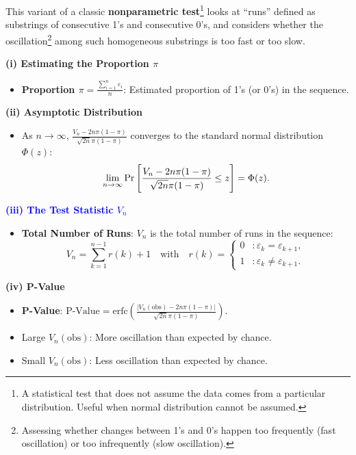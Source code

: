 \documentclass[12pt,openany]{book}
\theoremstyle{definition}
\begin{document}
	This variant of a classic \textbf{nonparametric test}\footnote{A statistical test that does not assume the data comes from a particular distribution. Useful when normal distribution cannot be assumed.} looks at ``runs'' defined as substrings of consecutive 1's and consecutive 0's, and considers whether the oscillation\footnote{Assessing whether changes between 1's and 0's happen too frequently (fast oscillation) or too infrequently (slow oscillation).} among such homogeneous substrings is too fast or too slow.
	\vspace{12pt}
	\begin{tcolorbox}[colback=white,colframe=lemcolor,arc=5pt,title={\color{white}\bf Runs Test}]
		\textbf{(i) Estimating the Proportion \( \pi \)}
		\begin{itemize}
			\item \textbf{Proportion \(\displaystyle \pi=\frac{\sum_{i=1}^{n} \varepsilon_i}{n} \)}: Estimated proportion of 1's (or 0's) in the sequence.
		\end{itemize}
		
		\textbf{(ii) Asymptotic Distribution}
		\begin{itemize}
			\item As \( n\to\infty \), \( \frac{V_n - 2n\pi(1 - \pi)}{\sqrt{2n}\pi(1 - \pi)} \) converges to the standard normal distribution \( \Phi(z) \): \[
			\lim\limits_{n\to\infty}\Pr\sbr{\frac{V_n - 2n\pi(1 - \pi)}{\sqrt{2n}\pi(1 - \pi)}\leq z}=\Phi(z).
			\]
		\end{itemize}
		
		\textcolor{blue}{\bf (iii) The Test Statistic \( V_n \)}
		\begin{itemize}
			\item \textbf{Total Number of Runs}: \( V_n \) is the total number of runs in the sequence:\[
			V_n=\sum_{k=1}^{n-1}r(k)+1\quad\text{with}\quad r(k)=\begin{cases}
				0 &:\varepsilon_k=\varepsilon_{k+1},\\
				1 &:\varepsilon_k\neq\varepsilon_{k+1}.
			\end{cases}
			\]
		\end{itemize}
		
		\textbf{(iv) P-Value}
		\begin{itemize}
			\item \textbf{P-Value}: \(\text{P-Value} = \text{erfc}\left(\frac{|V_n(\text{obs}) - 2n\pi(1 - \pi)|}{\sqrt{2n}\pi(1 - \pi)}\right)\).
			\item Large \( V_n(\text{obs}) \): More oscillation than expected by chance.
			\item Small \( V_n(\text{obs}) \): Less oscillation than expected by chance.
		\end{itemize}
	\end{tcolorbox}
	
\end{document}
